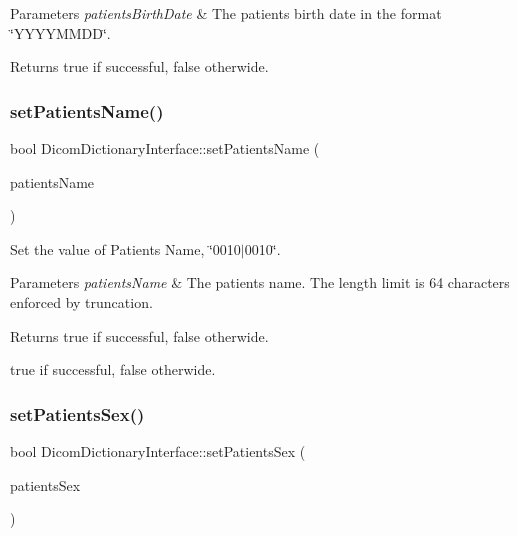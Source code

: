 \begin{DoxyParams}{Parameters}
{\em patients\+Birth\+Date} & The patient\textquotesingle{}s birth date in the format \char`\"{}\+Y\+Y\+Y\+Y\+M\+M\+D\+D\char`\"{}. \\
\hline
\end{DoxyParams}
\begin{DoxyReturn}{Returns}
true if successful, false otherwide. 
\end{DoxyReturn}
\mbox{\label{class_dicom_dictionary_interface_a7f951011d920b735e5945b4641790379}} 
\subsubsection{\texorpdfstring{set\+Patients\+Name()}{setPatientsName()}}
{\footnotesize\ttfamily bool Dicom\+Dictionary\+Interface\+::set\+Patients\+Name (\begin{DoxyParamCaption}\item[{Q\+String}]{patients\+Name }\end{DoxyParamCaption})}



Set the value of Patient\textquotesingle{}s Name, \char`\"{}0010$\vert$0010\char`\"{}. 


\begin{DoxyParams}{Parameters}
{\em patients\+Name} & The patient\textquotesingle{}s name. The length limit is 64 characters enforced by truncation. \\
\hline
\end{DoxyParams}
\begin{DoxyReturn}{Returns}
true if successful, false otherwide. 

true if successful, false otherwide. 
\end{DoxyReturn}
\mbox{\label{class_dicom_dictionary_interface_a3817ad4c976c14cc74d7e75e86dc0979}} 
\subsubsection{\texorpdfstring{set\+Patients\+Sex()}{setPatientsSex()}}
{\footnotesize\ttfamily bool Dicom\+Dictionary\+Interface\+::set\+Patients\+Sex (\begin{DoxyParamCaption}\item[{Q\+String}]{patients\+Sex }\end{DoxyParamCaption})}



